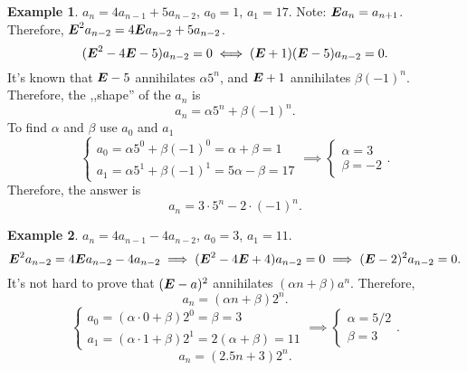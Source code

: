 \documentclass[a4paper]{article}
\theoremstyle{definition}
\newtheorem{example}{Example}[section]
\begin{document}
\begin{example}
  \(a_n = 4 a_{n - 1} + 5 a_{n - 2}\), \(a_0 = 1\), \(a_1 = 17\).
  Note: \(\boldsymbol{E} a_n = a_{n + 1}\).
  Therefore, \(\boldsymbol{E}^2 a_{n - 2} = 4 \boldsymbol{E} a_{n - 2} + 5 a_{n - 2}\).
  \[
    (\boldsymbol{E}^2 - 4 \boldsymbol{E} - 5) a_{n - 2} = 0
    \iff
    (\boldsymbol{E} + 1)(\boldsymbol{E} - 5) a_{n - 2} = 0
  .\]
  It's known that \(\boldsymbol{E} - 5\) annihilates \(\alpha 5^n\),
  and \(\boldsymbol{E} + 1\) annihilates \(\beta (-1)^n\).
  Therefore, the ,,shape'' of the \(a_n\) is
   \[
    a_n = \alpha 5^n + \beta (-1)^n
  .\]
  To find \(\alpha\) and \(\beta\) use \(a_0\) and \(a_1\)
  \[
  \begin{cases}
    a_0 = \alpha 5^0 + \beta (-1)^0 = \alpha + \beta = 1 \\
    a_1 = \alpha 5^1 + \beta (-1)^1 = 5 \alpha - \beta = 17
  \end{cases}
  \implies
  \begin{cases}
    \alpha = 3 \\
    \beta = -2
  \end{cases}
  .\]
  Therefore, the answer is
  \[
  a_n = 3 \cdot 5^n - 2 \cdot (-1)^n
  .\]
\end{example}
\begin{example}
  \(a_n = 4 a_{n - 1} - 4 a_{n - 2}\), \(a_0 = 3\), \(a_1 = 11\).
  \[
    \boldsymbol{E}^2 a_{n - 2} = 4 \boldsymbol{E} a_{n - 2} - 4 a_{n - 2}
    \implies
    (\boldsymbol{E}^2 - 4 \boldsymbol{E} + 4) a_{n - 2} = 0
    \implies
    (\boldsymbol{E} - 2)^2 a_{n - 2} = 0
  .\]
  It's not hard to prove that \((\boldsymbol{E} - a)^2\) annihilates
  \((\alpha n + \beta) a^n\).
  Therefore,
  \[
  a_n = (\alpha n + \beta) 2^n
  .\]
  \[
  \begin{cases}
    a_0 = (\alpha \cdot 0 + \beta) 2^0 = \beta = 3 \\
    a_1 = (\alpha \cdot 1 + \beta) 2^1 = 2 (\alpha + \beta) = 11
  \end{cases}
  \implies
  \begin{cases}
    \alpha = 5/2 \\
    \beta = 3
  \end{cases}
  .\]
  \[
    a_n = (2.5 n + 3) 2^n
  .\]
\end{example}
\end{document}
